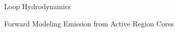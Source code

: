 \documentclass[final]{beamer}
\begin{document}
\begin{frame}
\begin{columns}[T]
\begin{column}{0.49\linewidth}
\begin{block}{Loop Hydrodynamics}
\begin{itemize}
    \end{itemize}
    \end{block}
    \begin{block}{Forward Modeling Emission from Active Region Cores}
    \begin{columns}[c]
        \begin{column}{0.49\columnwidth}
            \begin{figure}
\end{figure}
\end{column}
\end{columns}
\end{block}
\end{column}
\end{columns}
\end{frame}
\end{document}
